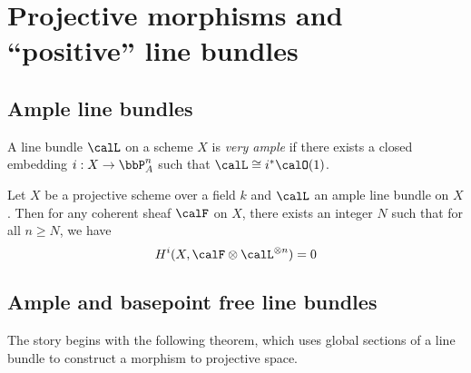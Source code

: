 \section{Projective morphisms and ``positive'' line bundles}


\subsection{Ample line bundles}

    \begin{definition}\label{def:very_ample_line_bundle}
        A line bundle \(\calL\) on a scheme \(X\) is \emph{very ample} if there exists a closed embedding \(i:X\to \bbP^n_A\) such that \(\calL\cong i^*\calO(1)\).
    \end{definition}

    \begin{theorem}\label{thm:Serre_vanishing}
        Let \(X\) be a projective scheme over a field \(k\) and \(\calL\) an ample line bundle on \(X\). 
        Then for any coherent sheaf \(\calF\) on \(X\), there exists an integer \(N\) such that for all \(n \geq N\), we have
        \[ H^i(X, \calF \otimes \calL^{\otimes n}) = 0 \]
    \end{theorem}

\subsection{Ample and basepoint free line bundles}

    The story begins with the following theorem, which uses global sections of a line bundle to construct a morphism to projective space.

